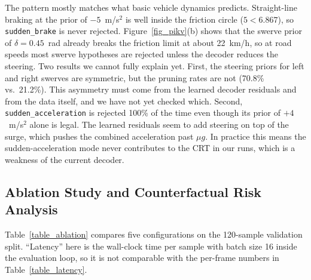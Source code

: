 \documentclass[preprint,12pt]{elsarticle}
\begin{document}
The pattern mostly matches what basic vehicle dynamics predicts. Straight-line braking at the prior of $-5$~m/s$^2$ is well inside the friction circle ($5 < 6.867$), so \texttt{sudden\_brake} is never rejected. Figure~\ref{fig_pikv}(b) shows that the swerve prior of $\delta = 0.45$~rad already breaks the friction limit at about 22~km/h, so at road speeds most swerve hypotheses are rejected unless the decoder reduces the steering. Two results we cannot fully explain yet. First, the steering priors for left and right swerves are symmetric, but the pruning rates are not (70.8\% vs.\ 21.2\%). This asymmetry must come from the learned decoder residuals and from the data itself, and we have not yet checked which. Second, \texttt{sudden\_acceleration} is rejected 100\% of the time even though its prior of $+4$~m/s$^2$ alone is legal. The learned residuals seem to add steering on top of the surge, which pushes the combined acceleration past $\mu g$. In practice this means the sudden-acceleration mode never contributes to the CRT in our runs, which is a weakness of the current decoder.

\subsection{Ablation Study and Counterfactual Risk Analysis}
Table~\ref{table_ablation} compares five configurations on the 120-sample validation split. ``Latency'' here is the wall-clock time per sample with batch size 16 inside the evaluation loop, so it is not comparable with the per-frame numbers in Table~\ref{table_latency}.

\begin{table}[H]
\caption{Ablation study on the 120-sample validation split (anomaly threshold CRT $> 0.4$).}
\centering
\label{table_ablation}
\end{table}
\end{document}
